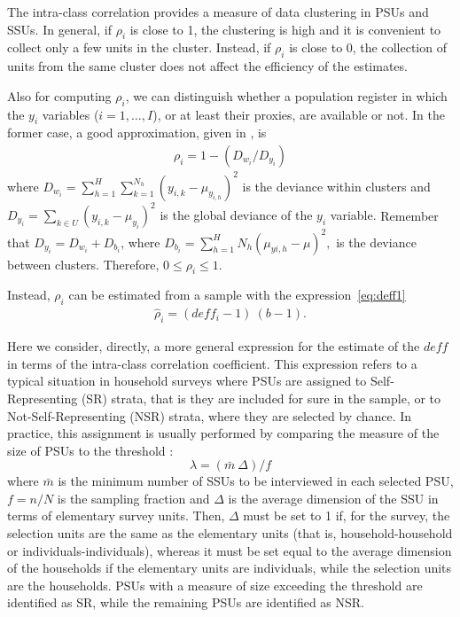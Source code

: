 The intra-class correlation provides a measure of data clustering in PSUs and SSUs. 
In general, if $\rho_i$ is close to 1, the clustering is high and it is convenient to collect only a few units in the cluster. 
Instead, if $\rho_i$ is close to 0, the collection of units from the same cluster does not affect the efficiency of the estimates. 

Also for computing $\rho_i$, we can distinguish whether a population register in which the $y_i$ variables ($i=1,\dots,I$), or at least their proxies, are available or not.
In the former case, a good approximation, given in {\cite{cicchitelli1992campionamento}, is
\begin{eqnarray}
	\label{eq:rho_pop}
	\rho_i=1 - \left({D_{w_i}} / {D_{y_i}} \right)  
\end{eqnarray}
where $D_{w_i} = \sum_{h=1}^H \sum_{k=1}^{N_h} \left( y_{i,k} - \mu_{y_{i,h}} \right)^2$ is the deviance within clusters and $D_{y_i} = \sum_{k \in U} \left(y_{i,k} - \mu_{y_i}\right)^2$ is the global deviance of the $y_i$ variable.} 
Remember that $D_{y_i}= D_{w_i} + D_{b_i}$, where
$
D_{b_i} = \sum_{h=1}^H N_h \left(\mu_{yi,h} - \mu \right)^2,
$
is the deviance between clusters.
Therefore, $0 \leq \rho_i \leq 1$. 

Instead, $\rho_i$ can be estimated from a sample with the expression~\eqref{eq:deff1}
\begin{eqnarray}
	\label{eq:rho_est}
	\hat{\rho}_{i} = \left({deff_i - 1} \right) \ \left({b-1} \right).
\end{eqnarray}

Here we consider, directly, a more general expression for the estimate of the $deff$ in terms of the intra-class correlation coefficient.
This expression refers to a typical situation in household surveys where PSUs are assigned to Self-Representing (SR) strata, that is they are included for sure in the sample, or to Not-Self-Representing (NSR) strata, where they are selected by chance.
In practice, this assignment is usually performed by comparing the measure of the size of PSUs to the threshold {\citep[see, e.g.,][]{hansen1953sample}}:
\begin{equation}
	\label{eq:threshold}
	\lambda = \left({\bar{m} \ \Delta} \right) / {f}
\end{equation}
where $\bar{m}$ is the minimum number of SSUs to be interviewed in each selected PSU, $f=n/N$ is the sampling fraction and $\Delta$ is the average dimension of the SSU in terms of elementary survey units.
Then, $\Delta$ must be set to 1 if, for the survey, the selection units are the same as the elementary units (that is, household-household or individuals-individuals), whereas it must be set equal to the average dimension of the households if the elementary units are individuals, while the selection units are the households. 
PSUs with a measure of size exceeding the threshold are identified as SR, while the remaining PSUs are identified as NSR.

